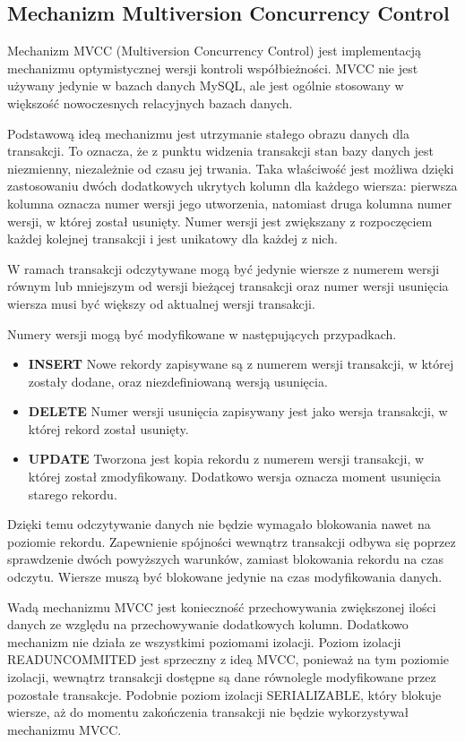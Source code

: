 \subsection{Mechanizm Multiversion Concurrency Control}
Mechanizm MVCC (Multiversion Concurrency Control) jest implementacją mechanizmu optymistycznej wersji kontroli współbieżności. MVCC nie jest używany jedynie w bazach danych MySQL, ale jest ogólnie stosowany w większość nowoczesnych relacyjnych bazach danych.

Podstawową ideą mechanizmu jest utrzymanie stałego obrazu danych dla transakcji. To oznacza, że z punktu widzenia transakcji stan bazy danych jest niezmienny, niezależnie od czasu jej trwania. Taka właściwość jest możliwa dzięki zastosowaniu dwóch dodatkowych ukrytych kolumn dla każdego wiersza: pierwsza kolumna oznacza numer wersji jego utworzenia, natomiast druga kolumna numer wersji, w której został usunięty. Numer wersji jest zwiększany z rozpoczęciem każdej kolejnej transakcji i jest unikatowy dla każdej z nich. 

W ramach transakcji odczytywane mogą być jedynie wiersze z numerem wersji równym lub mniejszym od wersji bieżącej transakcji oraz numer wersji usunięcia wiersza musi być większy od aktualnej wersji transakcji.

Numery wersji mogą być modyfikowane w następujących przypadkach.
\begin{itemize}
	\item \textbf{INSERT} Nowe rekordy zapisywane są z numerem wersji transakcji, w której zostały dodane, oraz niezdefiniowaną wersją usunięcia.
	\item \textbf{DELETE} Numer wersji usunięcia zapisywany jest jako wersja transakcji, w której rekord został usunięty.
	\item \textbf{UPDATE} Tworzona jest kopia rekordu z numerem wersji transakcji, w której został zmodyfikowany. Dodatkowo wersja oznacza moment usunięcia starego rekordu.
\end{itemize}

Dzięki temu odczytywanie danych nie będzie wymagało blokowania nawet na poziomie rekordu. Zapewnienie spójności wewnątrz transakcji odbywa się poprzez sprawdzenie dwóch powyższych warunków, zamiast blokowania rekordu na czas odczytu. Wiersze muszą być blokowane jedynie na czas modyfikowania danych. 

Wadą mechanizmu MVCC jest konieczność przechowywania zwiększonej ilości danych ze względu na przechowywanie dodatkowych kolumn. Dodatkowo mechanizm nie działa ze wszystkimi poziomami izolacji. Poziom izolacji \newline READ\textunderscore UNCOMMITED jest sprzeczny z ideą MVCC, ponieważ na tym poziomie izolacji, wewnątrz transakcji dostępne są dane równolegle modyfikowane przez pozostałe transakcje. Podobnie poziom izolacji SERIALIZABLE, który blokuje wiersze, aż do momentu zakończenia transakcji nie będzie wykorzystywał mechanizmu MVCC.
